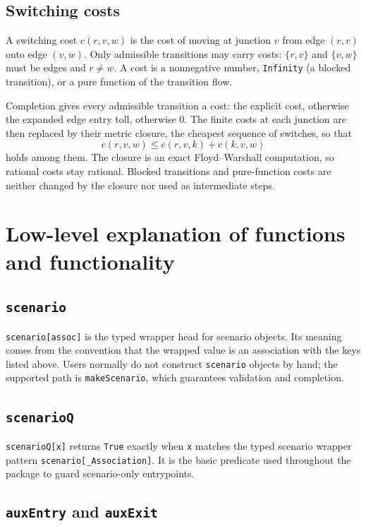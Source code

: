 \documentclass[11pt]{article}
\begin{document}
\subsection*{Switching costs}

A switching cost $c(r,v,w)$ is the cost of moving at junction $v$ from edge $(r,v)$ onto edge $(v,w)$. Only admissible transitions may carry costs: $\{r,v\}$ and $\{v,w\}$ must be edges and $r \neq w$. A cost is a nonnegative number, \texttt{Infinity} (a blocked transition), or a pure function of the transition flow.

Completion gives every admissible transition a cost: the explicit cost, otherwise the expanded edge entry toll, otherwise $0$. The finite costs at each junction are then replaced by their metric closure, the cheapest sequence of switches, so that
\[
  c(r,v,w) \le c(r,v,k) + c(k,v,w)
\]
holds among them. The closure is an exact Floyd--Warshall computation, so rational costs stay rational. Blocked transitions and pure-function costs are neither changed by the closure nor used as intermediate steps.

\section{Low-level explanation of functions and functionality}

\subsection*{\texttt{scenario}}

\texttt{scenario[assoc]} is the typed wrapper head for scenario objects. Its meaning comes from the convention that the wrapped value is an association with the keys listed above. Users normally do not construct \texttt{scenario} objects by hand; the supported path is \texttt{makeScenario}, which guarantees validation and completion.

\subsection*{\texttt{scenarioQ}}

\texttt{scenarioQ[x]} returns \texttt{True} exactly when \texttt{x} matches the typed scenario wrapper pattern \texttt{scenario[\_Association]}. It is the basic predicate used throughout the package to guard scenario-only entrypoints.

\subsection*{\texttt{auxEntry} and \texttt{auxExit}}
\end{document}
